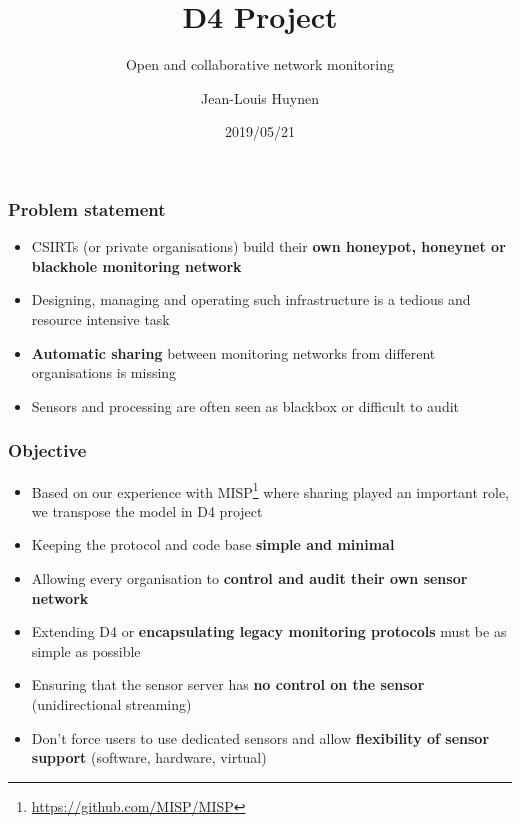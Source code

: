 \documentclass{beamer}
\title{D4 Project}
\subtitle{Open and collaborative network monitoring}
\author{Jean-Louis Huynen}
\institute{Team CIRCL \\ \url{https://www.d4-project.org/}}
\date{2019/05/21}
\begin{document}
    \begin{frame}
        \maketitle
    \end{frame}

\begin{frame}
        \frametitle{Problem statement}
        \begin{itemize}
                \item CSIRTs (or private organisations) build their {\bf own honeypot, honeynet or blackhole monitoring network}
                \item Designing, managing and operating such infrastructure is a tedious and resource intensive task
                \item {\bf Automatic sharing} between monitoring networks from different organisations is missing
                \item Sensors and processing are often seen as blackbox or difficult to audit

        \end{itemize}
\end{frame}


\begin{frame}
 \frametitle{Objective}
 \begin{itemize}
         \item Based on our experience with
           MISP\footnote{\url{https://github.com/MISP/MISP}} where sharing
           played an important role, we transpose the model in D4 project
         \item Keeping the protocol and code base {\bf simple and minimal}
         \item Allowing every organisation to {\bf control and audit their own sensor network}
         \item Extending D4 or {\bf encapsulating legacy monitoring protocols} must be as simple as possible
         \item Ensuring that the sensor server has {\bf no control on the sensor} (unidirectional streaming)
         \item Don't force users to use dedicated sensors and allow {\bf flexibility of sensor support} (software, hardware, virtual)

 \end{itemize}
\end{frame}
\end{document}
